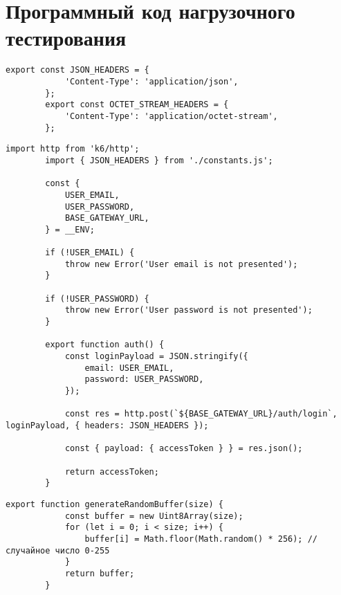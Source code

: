 \chapter{Программный код нагрузочного тестирования}
\label{chap:load_testing_code}

	\begin{lstlisting}[caption={constants.js}]
		export const JSON_HEADERS = {
			'Content-Type': 'application/json',
		};
		export const OCTET_STREAM_HEADERS = {
			'Content-Type': 'application/octet-stream',
		};
	\end{lstlisting}
	
	\begin{lstlisting}[caption={auth.js}]
		import http from 'k6/http';
		import { JSON_HEADERS } from './constants.js';
		
		const {
			USER_EMAIL,
			USER_PASSWORD,
			BASE_GATEWAY_URL,
		} = __ENV;
		
		if (!USER_EMAIL) {
			throw new Error('User email is not presented');
		}
		
		if (!USER_PASSWORD) {
			throw new Error('User password is not presented');
		}
		
		export function auth() {
			const loginPayload = JSON.stringify({
				email: USER_EMAIL,
				password: USER_PASSWORD,
			});
			
			const res = http.post(`${BASE_GATEWAY_URL}/auth/login`, loginPayload, { headers: JSON_HEADERS });
			
			const { payload: { accessToken } } = res.json();
			
			return accessToken;
		}
	\end{lstlisting}
	
	\begin{lstlisting}[caption={utils.js}]
		export function generateRandomBuffer(size) {
			const buffer = new Uint8Array(size);
			for (let i = 0; i < size; i++) {
				buffer[i] = Math.floor(Math.random() * 256); // случайное число 0-255
			}
			return buffer;
		}
	\end{lstlisting}
	
